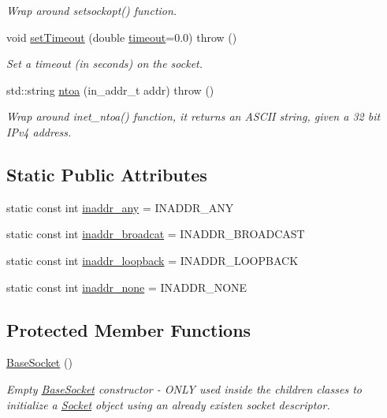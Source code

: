 \begin{CompactItemize}
\begin{CompactList}\small\item\em Wrap around setsockopt() function. \item\end{CompactList}\item 
void \hyperlink{classusock_1_1BaseSocket_e31552b42df68bc68fe557caf6e75128}{setTimeout} (double \hyperlink{classusock_1_1BaseSocket_b419e8fd0b849c74b73a02d6bd9081e3}{timeout}=0.0)  throw ()
\begin{CompactList}\small\item\em Set a timeout (in seconds) on the socket. \item\end{CompactList}\item 
std::string \hyperlink{classusock_1_1BaseSocket_3da108b8c23df3b521ded0bc4ae5295c}{ntoa} (in\_\-addr\_\-t addr)  throw ()
\begin{CompactList}\small\item\em Wrap around inet\_\-ntoa() function, it returns an ASCII string, given a 32 bit IPv4 address. \item\end{CompactList}\end{CompactItemize}
\subsection*{Static Public Attributes}
\begin{CompactItemize}
\item 
static const int \hyperlink{classusock_1_1BaseSocket_7b468e99479cf6c1e78e7c11ffe3b7c4}{inaddr\_\-any} = INADDR\_\-ANY
\item 
static const int \hyperlink{classusock_1_1BaseSocket_0ecd3c3f3d1c7d39e5d208ff9ae05578}{inaddr\_\-broadcat} = INADDR\_\-BROADCAST
\item 
static const int \hyperlink{classusock_1_1BaseSocket_bb1df5061201886e6190acdbf0f197e4}{inaddr\_\-loopback} = INADDR\_\-LOOPBACK
\item 
static const int \hyperlink{classusock_1_1BaseSocket_47df56bb0f6fadf6d309517526704efd}{inaddr\_\-none} = INADDR\_\-NONE
\end{CompactItemize}
\subsection*{Protected Member Functions}
\begin{CompactItemize}
\item 
\hyperlink{classusock_1_1BaseSocket_20f598433d6c3a97656f0179f7371218}{BaseSocket} ()
\begin{CompactList}\small\item\em Empty \hyperlink{classusock_1_1BaseSocket}{BaseSocket} constructor - ONLY used inside the children classes to initialize a \hyperlink{classusock_1_1Socket}{Socket} object using an already existen socket descriptor. \item\end{CompactList}\end{CompactItemize}
